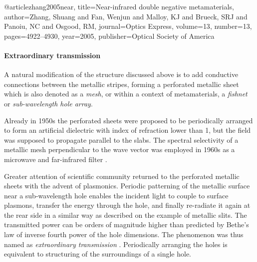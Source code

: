 @article{zhang2005near,
  title={Near-infrared double negative metamaterials},
  author={Zhang, Shuang and Fan, Wenjun and Malloy, KJ and Brueck, SRJ and Panoiu, NC and Osgood, RM},
  journal={Optics Express},
  volume={13},
  number={13},
  pages={4922--4930},
  year={2005},
  publisher={Optical Society of America}
}






\paragraph{Extraordinary transmission}
A natural modification of the structure discussed  above is to add conductive connections between the metallic stripes, forming a perforated metallic sheet which is also denoted as a \textit{mesh}, or within a context of metamaterials, a \textit{fishnet} or \textit{sub-wavelength hole array}. 

Already in 1950s the perforated sheets were proposed to be periodically arranged to form an artificial dielectric \cite[p. 58]{brown1953artificial} with index of refraction lower than 1, but the field was supposed to propagate parallel to the slabs.  %
The spectral selectivity of a metallic mesh perpendicular to the wave vector was employed in 1960s as a microwave and far-infrared filter \cite{ulrich1967effective,ulrich1967far, vogel1964transmission}.  %

Greater attention of scientific community returned to the perforated metallic sheets with the advent of plasmonics. Periodic patterning of the metallic surface near a sub-wavelength hole enables the incident light to couple to surface plasmons, transfer the energy through the hole, and finally re-radiate it again at the rear side in a similar way as described on the example of metallic slits. 
The transmitted power can be orders of magnitude higher than predicted by Bethe's law of inverse fourth power of the hole dimensions. The  %
phenomenon was thus named as \textit{extraordinary transmission} \cite{ebbesen1998extraordinary}.
Periodically arranging the holes is equivalent to structuring of the surroundings of a single hole.


